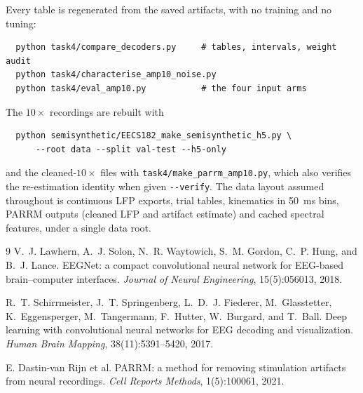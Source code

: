 \documentclass[11pt]{article}
\begin{document}
Every table is regenerated from the saved artifacts, with no training and no tuning:
\begin{verbatim}
  python task4/compare_decoders.py     # tables, intervals, weight audit
  python task4/characterise_amp10_noise.py
  python task4/eval_amp10.py           # the four input arms
\end{verbatim}
The $10\times$ recordings are rebuilt with
\begin{verbatim}
  python semisynthetic/EECS182_make_semisynthetic_h5.py \
      --root data --split val-test --h5-only
\end{verbatim}
and the cleaned-$10\times$ files with \texttt{task4/make\_parrm\_amp10.py}, which also verifies
the re-estimation identity when given \texttt{-{}-verify}. The data layout assumed throughout
is continuous LFP exports, trial tables, kinematics in 50~ms bins, PARRM outputs (cleaned LFP
and artifact estimate) and cached spectral features, under a single data root.

\begin{thebibliography}{9}
V.~J. Lawhern, A.~J. Solon, N.~R. Waytowich, S.~M. Gordon, C.~P. Hung, and B.~J. Lance.
EEGNet: a compact convolutional neural network for EEG-based brain--computer interfaces.
\emph{Journal of Neural Engineering}, 15(5):056013, 2018.

R.~T. Schirrmeister, J.~T. Springenberg, L.~D.~J. Fiederer, M.~Glasstetter, K.~Eggensperger,
M.~Tangermann, F.~Hutter, W.~Burgard, and T.~Ball.
Deep learning with convolutional neural networks for EEG decoding and visualization.
\emph{Human Brain Mapping}, 38(11):5391--5420, 2017.

E. Dastin-van Rijn et al.
PARRM: a method for removing stimulation artifacts from neural recordings.
\emph{Cell Reports Methods}, 1(5):100061, 2021.
\end{thebibliography}
\end{document}
